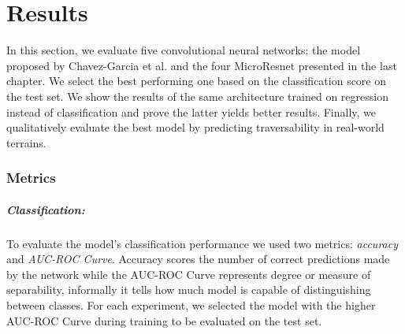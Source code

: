 \documentclass[../document.tex]{subfiles}
\begin{document}
\chapter{Results}
\label{chap: results}
In this section, we evaluate five convolutional neural networks: the model proposed by Chavez-Garcia et al. \cite{omar2018traversability} and the four MicroResnet presented in the last chapter. We  select the best performing one based on the classification score on the test set. We  show the results of the same architecture trained on regression instead of classification and prove the latter yields better results. Finally, we qualitatively evaluate the best model by predicting traversability in real-world terrains. 



\subsection{Metrics}
\paragraph{Classification:} To evaluate the model's classification performance we used two metrics: \emph{accuracy} and \emph{AUC-ROC Curve}. Accuracy scores the number of correct predictions made by the network while the AUC-ROC Curve represents degree or measure of separability, informally it tells how much model is capable of distinguishing between classes. For each experiment, we selected the model with the higher AUC-ROC Curve during training to be evaluated on the test set.
\end{document}
